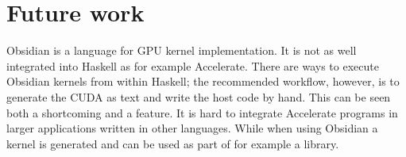 \documentclass[a4paper]{book}
\begin{document}




\FloatBarrier
%
%
\section{Future work} 

Obsidian is a language for GPU kernel implementation. It is not as well integrated 
into Haskell as for example Accelerate. There are ways to execute Obsidian kernels 
from within Haskell; the recommended workflow, however, is to generate the CUDA  
as text and write the host code by hand. This can be seen both a shortcoming 
and a feature. It is hard to integrate Accelerate programs in larger applications 
written in other languages. While when using Obsidian a kernel is generated and 
can be used as part of for example a library. 
\end{document}
